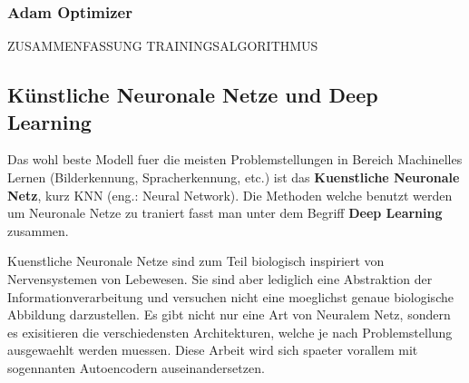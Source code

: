 \documentclass[../main]{subfiles}
\begin{document}
\subsubsection{Adam Optimizer}
ZUSAMMENFASSUNG TRAININGSALGORITHMUS

\pagebreak
\subsection{Künstliche Neuronale Netze und Deep Learning}
Das wohl beste Modell fuer die meisten Problemstellungen in Bereich Machinelles Lernen (Bilderkennung, Spracherkennung, etc.) ist das \textbf{Kuenstliche Neuronale Netz}, kurz KNN (eng.: Neural Network).
Die Methoden welche benutzt werden um Neuronale Netze zu traniert fasst man unter dem Begriff \textbf{Deep Learning} zusammen.

Kuenstliche Neuronale Netze sind zum Teil biologisch inspiriert von Nervensystemen von Lebewesen. Sie sind aber lediglich eine Abstraktion der Informationverarbeitung und versuchen nicht eine moeglichst genaue biologische Abbildung darzustellen.
Es gibt nicht nur eine Art von Neuralem Netz, sondern es exisitieren die
verschiedensten Architekturen, welche je nach Problemstellung ausgewaehlt werden
muessen. Diese Arbeit wird sich spaeter vorallem mit sogennanten Autoencodern auseinandersetzen.
\end{document}
